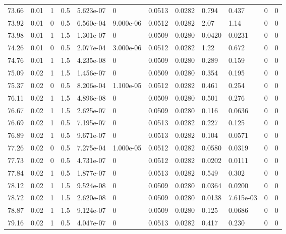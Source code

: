 \documentclass[preview]{standalone}
\begin{document}
{{{{{{\begin{tabular}{L{1.2cm}C{1.2cm} C{0.3cm}C{0.5cm} C{1.4cm}C{1.4cm} C{1.4cm}C{1.4cm} C{1.6cm}C{1.6cm} C{1.6cm}C{1.6cm}}
  73.66  &  0.01  & 1     & 0.5 &  5.623e-07  & 0  &  0.0513&   0.0282& 0.794 & 0.437   &  0 & 0  \\ 
  73.92  &  0.01  & 0     & 0.5 &  6.560e-04  & 9.000e-06  &  0.0512&   0.0282& 2.07 & 1.14   &  0 & 0  \\ 
  73.98  &  0.01  & 1     & 1.5 &  1.301e-07  & 0  &  0.0509&   0.0280& 0.0420 & 0.0231   &  0 & 0  \\ 
  74.26  &  0.01  & 0     & 0.5 &  2.077e-04  & 3.000e-06  &  0.0512&   0.0282& 1.22 & 0.672   &  0 & 0  \\ 
  74.76  &  0.01  & 1     & 1.5 &  4.235e-08  & 0  &  0.0509&   0.0280& 0.289 & 0.159   &  0 & 0  \\ 
  75.09  &  0.02  & 1     & 1.5 &  1.456e-07  & 0  &  0.0509&   0.0280& 0.354 & 0.195   &  0 & 0  \\ 
  75.37  &  0.02  & 0     & 0.5 &  8.206e-04  & 1.100e-05  &  0.0512&   0.0282& 0.461 & 0.254   &  0 & 0  \\ 
  76.11  &  0.02  & 1     & 1.5 &  4.896e-08  & 0  &  0.0509&   0.0280& 0.501 & 0.276   &  0 & 0  \\ 
  76.67  &  0.02  & 1     & 1.5 &  2.625e-07  & 0  &  0.0509&   0.0280& 0.116 & 0.0636   &  0 & 0  \\ 
  76.69  &  0.02  & 1     & 0.5 &  7.195e-07  & 0  &  0.0513&   0.0282& 0.227 & 0.125   &  0 & 0  \\ 
  76.89  &  0.02  & 1     & 0.5 &  9.671e-07  & 0  &  0.0513&   0.0282& 0.104 & 0.0571   &  0 & 0  \\ 
  77.26  &  0.02  & 0     & 0.5 &  7.275e-04  & 1.000e-05  &  0.0512&   0.0282& 0.0580 & 0.0319   &  0 & 0  \\ 
  77.73  &  0.02  & 0     & 0.5 &  4.731e-07  & 0  &  0.0512&   0.0282& 0.0202 & 0.0111   &  0 & 0  \\ 
  77.84  &  0.02  & 1     & 0.5 &  1.877e-07  & 0  &  0.0513&   0.0282& 0.549 & 0.302   &  0 & 0  \\ 
  78.12  &  0.02  & 1     & 1.5 &  9.524e-08  & 0  &  0.0509&   0.0280& 0.0364 & 0.0200   &  0 & 0  \\ 
  78.72  &  0.02  & 1     & 1.5 &  2.620e-08  & 0  &  0.0509&   0.0280& 0.0138 & 7.615e-03   &  0 & 0  \\ 
  78.87  &  0.02  & 1     & 1.5 &  9.124e-07  & 0  &  0.0509&   0.0280& 0.125 & 0.0686   &  0 & 0  \\ 
  79.16  &  0.02  & 1     & 0.5 &  4.047e-07  & 0  &  0.0513&   0.0282& 0.417 & 0.230   &  0 & 0  \\ 

\end{tabular}}}}}}}
\end{document}
